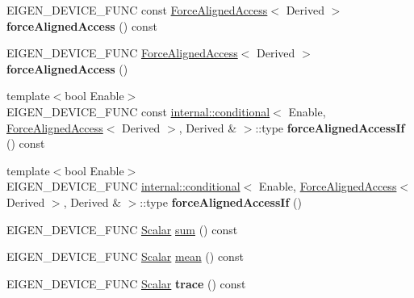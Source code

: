 \begin{DoxyCompactItemize}
E\+I\+G\+E\+N\+\_\+\+D\+E\+V\+I\+C\+E\+\_\+\+F\+U\+NC const \mbox{\hyperlink{class_eigen_1_1_force_aligned_access}{Force\+Aligned\+Access}}$<$ Derived $>$ {\bfseries force\+Aligned\+Access} () const
\item 
\mbox{\label{class_eigen_1_1_dense_base_adb4d3edabca49918b58fe1b1b5759531}} 
E\+I\+G\+E\+N\+\_\+\+D\+E\+V\+I\+C\+E\+\_\+\+F\+U\+NC \mbox{\hyperlink{class_eigen_1_1_force_aligned_access}{Force\+Aligned\+Access}}$<$ Derived $>$ {\bfseries force\+Aligned\+Access} ()
\item 
\mbox{\label{class_eigen_1_1_dense_base_a1a5efabbff8d9fd36da3579cbbc74c97}} 
{\footnotesize template$<$bool Enable$>$ }\\E\+I\+G\+E\+N\+\_\+\+D\+E\+V\+I\+C\+E\+\_\+\+F\+U\+NC const \mbox{\hyperlink{struct_eigen_1_1internal_1_1conditional}{internal\+::conditional}}$<$ Enable, \mbox{\hyperlink{class_eigen_1_1_force_aligned_access}{Force\+Aligned\+Access}}$<$ Derived $>$, Derived \& $>$\+::type {\bfseries force\+Aligned\+Access\+If} () const
\item 
\mbox{\label{class_eigen_1_1_dense_base_a1551e729c17c7f1b9b5958af0cbce232}} 
{\footnotesize template$<$bool Enable$>$ }\\E\+I\+G\+E\+N\+\_\+\+D\+E\+V\+I\+C\+E\+\_\+\+F\+U\+NC \mbox{\hyperlink{struct_eigen_1_1internal_1_1conditional}{internal\+::conditional}}$<$ Enable, \mbox{\hyperlink{class_eigen_1_1_force_aligned_access}{Force\+Aligned\+Access}}$<$ Derived $>$, Derived \& $>$\+::type {\bfseries force\+Aligned\+Access\+If} ()
\item 
E\+I\+G\+E\+N\+\_\+\+D\+E\+V\+I\+C\+E\+\_\+\+F\+U\+NC \mbox{\hyperlink{class_eigen_1_1_dense_base_a5feed465b3a8e60c47e73ecce83e39a2}{Scalar}} \mbox{\hyperlink{class_eigen_1_1_dense_base_a4dee689c76ff86da9d8e49950604597b}{sum}} () const
\item 
E\+I\+G\+E\+N\+\_\+\+D\+E\+V\+I\+C\+E\+\_\+\+F\+U\+NC \mbox{\hyperlink{class_eigen_1_1_dense_base_a5feed465b3a8e60c47e73ecce83e39a2}{Scalar}} \mbox{\hyperlink{class_eigen_1_1_dense_base_a89d85ac0cf349eb53481c148033459d7}{mean}} () const
\item 
\mbox{\label{class_eigen_1_1_dense_base_aec2e28e262377862835ba80932291997}} 
E\+I\+G\+E\+N\+\_\+\+D\+E\+V\+I\+C\+E\+\_\+\+F\+U\+NC \mbox{\hyperlink{class_eigen_1_1_dense_base_a5feed465b3a8e60c47e73ecce83e39a2}{Scalar}} {\bfseries trace} () const

\end{DoxyCompactItemize}
